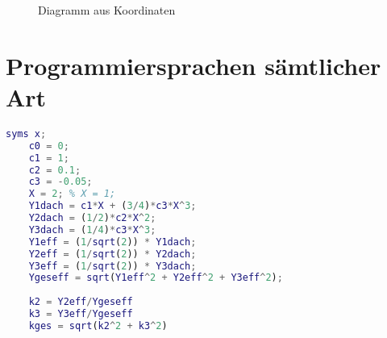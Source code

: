 
\resetlaborsectioncounter
{}
\begin{figure}[H]
	\centering
	\caption{Diagramm aus Koordinaten}
	\label{fig:2_2_diagramm}
\end{figure}


\newpage
\section{Programmiersprachen sämtlicher Art}
\label{code:matlab}
\begin{lstlisting}[language=matlab]
	syms x;
	c0 = 0;
	c1 = 1;
	c2 = 0.1;
	c3 = -0.05;
	X = 2; % X = 1;
	Y1dach = c1*X + (3/4)*c3*X^3;
	Y2dach = (1/2)*c2*X^2;
	Y3dach = (1/4)*c3*X^3;
	Y1eff = (1/sqrt(2)) * Y1dach;
	Y2eff = (1/sqrt(2)) * Y2dach;
	Y3eff = (1/sqrt(2)) * Y3dach;
	Ygeseff = sqrt(Y1eff^2 + Y2eff^2 + Y3eff^2);
	
	k2 = Y2eff/Ygeseff
	k3 = Y3eff/Ygeseff
	kges = sqrt(k2^2 + k3^2)
	
\end{lstlisting}








\newpage
